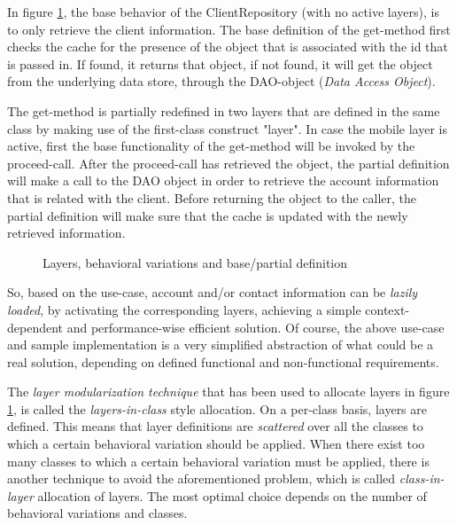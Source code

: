 \documentclass{acm_proc_article-sp}
\begin{document}
In figure \ref{fig:layers}, the base behavior of the ClientRepository (with no active layers), is to only retrieve the client information. The base definition of the get-method first checks the cache for the presence of the object that is associated with the id that is passed in. If found, it returns that object, if not found, it will get the object from the underlying data store, through the DAO-object (\textit{Data Access Object}). 

The get-method is partially redefined in two layers that are defined in the same class by making use of the first-class construct "layer". In case the mobile layer is active, first the base functionality of the get-method will be invoked by the proceed-call. After the proceed-call has retrieved the object, the partial definition will make a call to the DAO object in order to retrieve the account information that is related with the client. Before returning the object to the caller, the partial definition will make sure that the cache is updated with the newly retrieved information. 
\begin{figure}[H]
\centering
{}
\caption{Layers, behavioral variations and base/partial definition}
\label{fig:layers}
\end{figure}
So, based on the use-case, account and/or contact information can be \textit{lazily loaded}, by activating the corresponding layers, achieving a simple context-dependent and performance-wise efficient solution. Of course, the above use-case and sample implementation is a very simplified abstraction of what could be a real solution, depending on defined functional and non-functional requirements.

The \textit{layer modularization technique }that has been used to allocate layers in figure \ref{fig:layers}, is called the \textit{layers-in-class} style allocation. On a per-class basis, layers are defined. This means that layer definitions are \textit{scattered} over all the classes to which a certain behavioral variation should be applied. When there exist too many classes to which a certain behavioral variation must be applied, there is another technique to avoid the aforementioned problem, which is called \textit{class-in-layer} allocation of layers. The most optimal choice depends on the number of behavioral variations and classes.
\end{document}
